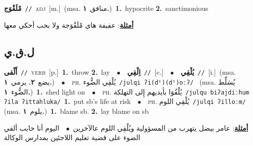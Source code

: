 \documentclass[10pt,a4paper,twoside]{article} %
\begin{document}
\begin{multicols}{2}
{\setlength\topsep{0pt}\textbf{\foreignlanguage{arabic}{مْلَقْوَج}}\ {\color{gray}\texttt{//}\color{black}}\ \textsc{adj}\ [m.]\ \color{gray}(msa. \foreignlanguage{arabic}{منافق}~\foreignlanguage{arabic}{\textbf{١.}})\color{black}\ \textbf{1.}~hypocrite  \textbf{2.}~sanctimonious\  \begin{flushright}\color{gray}\foreignlanguage{arabic}{\textbf{\underline{\foreignlanguage{arabic}{أمثلة}}}: عفيفة هاي مْلَقْوَجة ولا بحب أحكي معها}\end{flushright}\color{black}} \vspace{2mm}

\vspace{-3mm}
\subsection*{\color{blue}\foreignlanguage{arabic}{ل.ق.ي}\color{blue}{}} 

{\setlength\topsep{0pt}\textbf{\foreignlanguage{arabic}{أَلْقى}}\ {\color{gray}\texttt{//}\color{black}}\ \textsc{verb}\ [p.]\ \textbf{1.}~throw  \textbf{2.}~lay\ \ $\bullet$\ \ \setlength\topsep{0pt}\textbf{\foreignlanguage{arabic}{اِلْقِي}}\ {\color{gray}\texttt{//}\color{black}}\ [c.]\ \ $\bullet$\ \ \setlength\topsep{0pt}\textbf{\foreignlanguage{arabic}{يُلْقِي}}\ {\color{gray}\texttt{//}\color{black}}\ [i.]\ \color{gray}(msa. \foreignlanguage{arabic}{يضع}~\foreignlanguage{arabic}{\textbf{٢.}}  \foreignlanguage{arabic}{يرمي}~\foreignlanguage{arabic}{\textbf{١.}})\color{black}\ \ $\bullet$\ \ \textsc{ph.} \color{gray} \foreignlanguage{arabic}{يُلْقِي الضُّوء}\color{black}\ {\color{gray}\texttt{/{\sffamily julqi ʔi(dˤ)(dˤ)oːʔ}/}\color{black}}\ \color{gray} (msa. \foreignlanguage{arabic}{يُسَلِّط الضُّوء}~\foreignlanguage{arabic}{\textbf{١.}})\color{black}\ \textbf{1.}~shed light on\ \ $\bullet$\ \ \textsc{ph.} \color{gray} \foreignlanguage{arabic}{يُلْقُوَا بأيديهم إِلى التهلكة}\color{black}\ {\color{gray}\texttt{/{\sffamily julqu biʔajdiːhum ʔila ʔittahluka}/}\color{black}}\ \textbf{1.}~put sb's life at risk\ \ $\bullet$\ \ \textsc{ph.} \color{gray} \foreignlanguage{arabic}{يُلْقِي اللوم}\color{black}\ {\color{gray}\texttt{/{\sffamily julqi ʔilloːm}/}\color{black}}\ \color{gray} (msa. \foreignlanguage{arabic}{يلوم}~\foreignlanguage{arabic}{\textbf{١.}})\color{black}\ \textbf{1.}~blame sb.  \textbf{2.}~lay blame on sb\  \begin{flushright}\color{gray}\foreignlanguage{arabic}{\textbf{\underline{\foreignlanguage{arabic}{أمثلة}}}: عامر بيضل يتهرب من المسؤولية ويُلْقِي اللوم عالآخرين\ $\bullet$\ \  اليوم أنا حابب ألقي الضوء على قضية تعليم اللاجئين بمدارس الوكالة}\end{flushright}\color{black}} \vspace{2mm}


\end{multicols}
\end{document}
